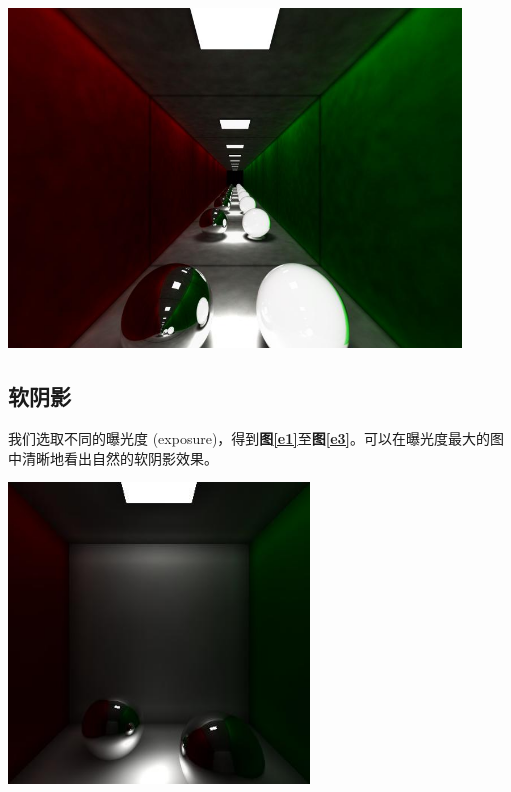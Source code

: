 \documentclass[11pt, a4paper]{article}
\makeatletter
\newcommand\fcaption{\def\@captype{figure}\caption}
\newcommand{\fref}[1]{\textbf{图\ref{#1}}}
\makeatother
\begin{document}
\begin{center}
    \includegraphics[width=12cm]{../outputs/anti_two_balls.jpeg}
    \fcaption{抗锯齿的Two balls}\label{ca}
\end{center}

\subsection{软阴影}

我们选取不同的曝光度 (exposure)，得到\fref{e1}至\fref{e3}。可以在曝光度最大的图中清晰地看出自然的软阴影效果。

\begin{center}
    \includegraphics[width=8cm]{../outputs/balls_exp_0.01.jpeg}
    \fcaption{Balls (exposure=0.01)}\label{e1}
\end{center}
\end{document}
